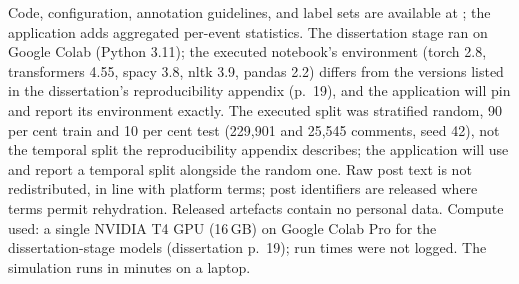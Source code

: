 Code, configuration, annotation guidelines, and label sets are available at ; the application adds aggregated per-event statistics. The dissertation stage ran on Google Colab (Python 3.11); the executed notebook's environment (torch 2.8, transformers 4.55, spacy 3.8, nltk 3.9, pandas 2.2) differs from the versions listed in the dissertation's reproducibility appendix (p.~19), and the application will pin and report its environment exactly. The executed split was stratified random, 90 per cent train and 10 per cent test (229,901 and 25,545 comments, seed 42), not the temporal split the reproducibility appendix describes; the application will use and report a temporal split alongside the random one. Raw post text is not redistributed, in line with platform terms; post identifiers are released where terms permit rehydration. Released artefacts contain no personal data. Compute used: a single NVIDIA T4 GPU (16\,GB) on Google Colab Pro for the dissertation-stage models (dissertation p.~19); run times were not logged. The simulation runs in minutes on a laptop. 
